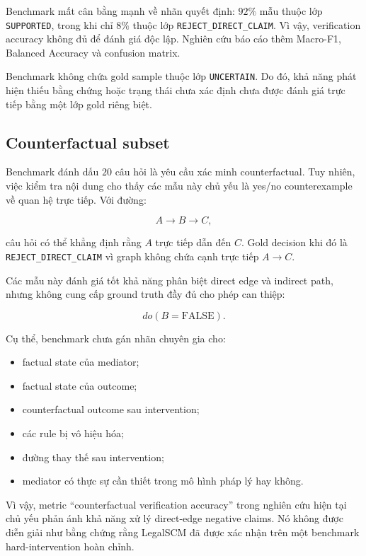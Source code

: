 Benchmark mất cân bằng mạnh về nhãn quyết định: \(92\%\) mẫu thuộc lớp
\texttt{SUPPORTED}, trong khi chỉ \(8\%\) thuộc lớp
\texttt{REJECT\_DIRECT\_CLAIM}. Vì vậy, verification accuracy không đủ để
đánh giá độc lập. Nghiên cứu báo cáo thêm Macro-F1, Balanced Accuracy và
confusion matrix.

Benchmark không chứa gold sample thuộc lớp \texttt{UNCERTAIN}. Do đó, khả
năng phát hiện thiếu bằng chứng hoặc trạng thái chưa xác định chưa được đánh
giá trực tiếp bằng một lớp gold riêng biệt.

\subsection{Counterfactual subset}

Benchmark đánh dấu \(20\) câu hỏi là yêu cầu xác minh counterfactual. Tuy
nhiên, việc kiểm tra nội dung cho thấy các mẫu này chủ yếu là
yes/no counterexample về quan hệ trực tiếp. Với đường:

\[
A \rightarrow B \rightarrow C,
\]

câu hỏi có thể khẳng định rằng \(A\) trực tiếp dẫn đến \(C\). Gold decision
khi đó là \texttt{REJECT\_DIRECT\_CLAIM} vì graph không chứa cạnh trực tiếp
\(A \rightarrow C\).

Các mẫu này đánh giá tốt khả năng phân biệt direct edge và indirect path,
nhưng không cung cấp ground truth đầy đủ cho phép can thiệp:

\[
do(B=\mathrm{FALSE}).
\]

Cụ thể, benchmark chưa gán nhãn chuyên gia cho:

\begin{itemize}
    \item factual state của mediator;
    \item factual state của outcome;
    \item counterfactual outcome sau intervention;
    \item các rule bị vô hiệu hóa;
    \item đường thay thế sau intervention;
    \item mediator có thực sự cần thiết trong mô hình pháp lý hay không.
\end{itemize}

Vì vậy, metric ``counterfactual verification accuracy'' trong nghiên cứu
hiện tại chủ yếu phản ánh khả năng xử lý direct-edge negative claims. Nó
không được diễn giải như bằng chứng rằng LegalSCM đã được xác nhận trên một
benchmark hard-intervention hoàn chỉnh.

